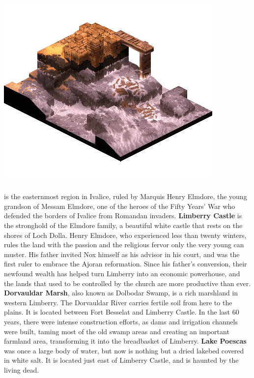 \includegraphics[width=\columnwidth]{./art/images/poeskas.png}
\\\\
%
 is the easternmost region in Ivalice, ruled by Marquis Henry Elmdore, the young grandson of Messam Elmdore, one of the heroes of the Fifty Years' War who defended the borders of Ivalice from Romandan invaders.
\textbf{Limberry Castle} is the stronghold of the Elmdore family, a beautiful white castle that rests on the shores of Loch Dolla. 
Henry Elmdore, who experienced less than twenty winters, rules the land with the passion and the religious fervor only the very young can muster.
His father invited Nox himself as his advisor in his court, and was the first ruler to embrace the Ajoran reformation.
Since his father's conversion, their newfound wealth has helped turn Limberry into an economic powerhouse, and the lands that used to be controlled by the church are more productive than ever.
\textbf{Dorvauldar Marsh}, also known as Dolbodar Swamp, is a rich marshland in western Limberry.
The Dorvauldar River carries fertile soil from here to the plains. 
It is located between Fort Besselat and Limberry Castle. 
In the last 60 years, there were intense construction efforts, as dams and irrigation channels were built, taming most of the old swamp areas and creating an important farmland area, transforming it into the breadbasket of Limberry.
\textbf{Lake Poescas} was once a large body of water, but now is nothing but a dried lakebed covered in white salt.
It is located just east of Limberry Castle, and is haunted by the living dead. 
